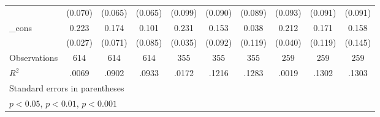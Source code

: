 {\begin{tabular}{l*{9}{c}}
            &     (0.070)         &     (0.065)         &     (0.065)         &     (0.099)         &     (0.090)         &     (0.089)         &     (0.093)         &     (0.091)         &     (0.091)         \\
[1em]
\_cons      &       0.223\sym{***}&       0.174\sym{*}  &       0.101         &       0.231\sym{***}&       0.153         &       0.038         &       0.212\sym{***}&       0.171         &       0.158         \\
            &     (0.027)         &     (0.071)         &     (0.085)         &     (0.035)         &     (0.092)         &     (0.119)         &     (0.040)         &     (0.119)         &     (0.145)         \\
\hline
Observations&         614         &         614         &         614         &         355         &         355         &         355         &         259         &         259         &         259         \\
\(R^{2}\)   &       .0069         &       .0902         &       .0933         &       .0172         &       .1216         &       .1283         &       .0019         &       .1302         &       .1303         \\
\hline\hline
\multicolumn{10}{l}{\footnotesize Standard errors in parentheses}\\
\multicolumn{10}{l}{\footnotesize \sym{*} \(p<0.05\), \sym{**} \(p<0.01\), \sym{***} \(p<0.001\)}\\
\end{tabular}
}
